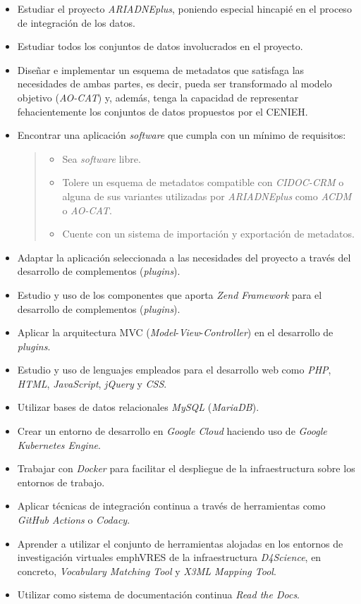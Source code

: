 \begin{itemize}
\tightlist
\item
  Estudiar el proyecto \emph{ARIADNEplus}, poniendo especial hincapié en el
  proceso de integración de los datos.
\item
  Estudiar todos los conjuntos de datos involucrados en el proyecto.
\item
  Diseñar e implementar un esquema de metadatos que satisfaga las
  necesidades de ambas partes, es decir, pueda ser transformado al
  modelo objetivo (\emph{AO-CAT}) y, además, tenga la capacidad de
  representar fehacientemente los conjuntos de datos propuestos por el
  CENIEH.
\item
  Encontrar una aplicación \emph{software} que cumpla con un mínimo de
  requisitos:

  \begin{quote}
  \begin{itemize}
  \tightlist
  \item
    Sea \emph{software} libre.
  \item
    Tolere un esquema de metadatos compatible con \emph{CIDOC-CRM} o
    alguna de sus variantes utilizadas por \emph{ARIADNEplus} como \emph{ACDM}
    o \emph{AO-CAT}.
  \item
    Cuente con un sistema de importación y exportación de metadatos.
  \end{itemize}
  \end{quote}
\item
  Adaptar la aplicación seleccionada a las necesidades del proyecto a
  través del desarrollo de complementos (\emph{plugins}).
\item
  Estudio y uso de los componentes que aporta \emph{Zend Framework} para el 
  desarrollo de complementos (\emph{plugins}).
\item
  Aplicar la arquitectura MVC
  (\emph{Model}-\emph{View}-\emph{Controller}) en el desarrollo de
  \emph{plugins}.
\item
  Estudio y uso de lenguajes empleados para el desarrollo web como
  \emph{PHP}, \emph{HTML}, \emph{JavaScript}, \emph{jQuery} y
  \emph{CSS}.
\item
  Utilizar bases de datos relacionales \emph{MySQL} (\emph{MariaDB}).
\item
  Crear un entorno de desarrollo en \emph{Google Cloud} haciendo uso de \emph{Google Kubernetes Engine}.
\item
  Trabajar con \emph{Docker} para facilitar el despliegue de la
  infraestructura sobre los entornos de trabajo.
\item
  Aplicar técnicas de integración continua a través de herramientas como
  \emph{GitHub Actions} o \emph{Codacy}.
\item
  Aprender a utilizar el conjunto de herramientas alojadas en los entornos de investigación
  virtuales emph{VRES} de la infraestructura \emph{D4Science}, en concreto, \emph{Vocabulary
  Matching Tool} y \emph{X3ML Mapping Tool}.
\item
  Utilizar como sistema de documentación continua \emph{Read the Docs}.
\end{itemize}

